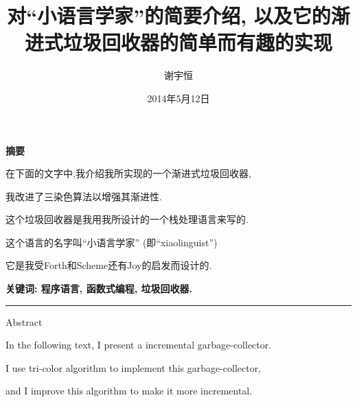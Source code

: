 \documentclass[a4paper]{article}
\begin{document}
\title{对``小语言学家''的简要介绍, 以及它的渐进式垃圾回收器的简单而有趣的实现}
\author{谢宇恒}
\date{2014年5月12日}

\maketitle



\begin{center}
\textbf{摘要}
\end{center}

\begin{center}
在下面的文字中,我介绍我所实现的一个渐进式垃圾回收器,
\end{center}

\begin{center}
我改进了三染色算法以增强其渐进性.
\end{center}

\begin{center}
这个垃圾回收器是我用我所设计的一个栈处理语言来写的.
\end{center}

\begin{center}
这个语言的名字叫``小语言学家'' (即``xiaolinguist'')
\end{center}

\begin{center}
它是我受Forth和Scheme还有Joy的启发而设计的.
\end{center}

\begin{center}
\textbf{关键词: 程序语言, 函数式编程, 垃圾回收器.}
\end{center}

\vspace{.5cm}\hrule\vspace{.5cm}

\begin{center}
Abstract
\end{center}

\begin{center}
In the following text, I present a incremental garbage-collector.
\end{center}

\begin{center}
I use tri-color algorithm to implement this garbage-collector,
\end{center}

\begin{center}
and I improve this algorithm to make it more incremental.
\end{center}
\end{document}
